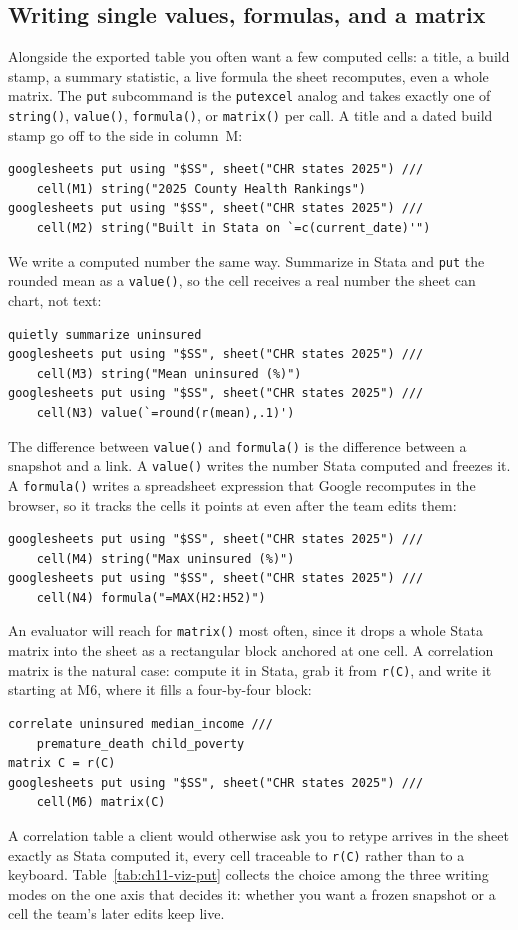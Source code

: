 \subsection{Writing single values, formulas, and a matrix}
Alongside the exported table you often want a few computed cells: a title, a build stamp, a summary statistic, a live formula the sheet recomputes, even a whole matrix. The \texttt{put} subcommand is the \texttt{putexcel} analog and takes exactly one of \texttt{string()}, \texttt{value()}, \texttt{formula()}, or \texttt{matrix()} per call. A title and a dated build stamp go off to the side in column~M:
\par
{\footnotesize
\begin{verbatim}
googlesheets put using "$SS", sheet("CHR states 2025") ///
    cell(M1) string("2025 County Health Rankings")
googlesheets put using "$SS", sheet("CHR states 2025") ///
    cell(M2) string("Built in Stata on `=c(current_date)'")
\end{verbatim}
}
We write a computed number the same way. Summarize in Stata and \texttt{put} the rounded mean as a \texttt{value()}, so the cell receives a real number the sheet can chart, not text:
\par
{\footnotesize
\begin{verbatim}
quietly summarize uninsured
googlesheets put using "$SS", sheet("CHR states 2025") ///
    cell(M3) string("Mean uninsured (%)")
googlesheets put using "$SS", sheet("CHR states 2025") ///
    cell(N3) value(`=round(r(mean),.1)')
\end{verbatim}
}
The difference between \texttt{value()} and \texttt{formula()} is the difference between a snapshot and a link. A \texttt{value()} writes the number Stata computed and freezes it. A \texttt{formula()} writes a spreadsheet expression that Google recomputes in the browser, so it tracks the cells it points at even after the team edits them:
\par
{\footnotesize
\begin{verbatim}
googlesheets put using "$SS", sheet("CHR states 2025") ///
    cell(M4) string("Max uninsured (%)")
googlesheets put using "$SS", sheet("CHR states 2025") ///
    cell(N4) formula("=MAX(H2:H52)")
\end{verbatim}
}
An evaluator will reach for \texttt{matrix()} most often, since it drops a whole Stata matrix into the sheet as a rectangular block anchored at one cell. A correlation matrix is the natural case: compute it in Stata, grab it from \texttt{r(C)}, and write it starting at M6, where it fills a four-by-four block:
\par
{\footnotesize
\begin{verbatim}
correlate uninsured median_income ///
    premature_death child_poverty
matrix C = r(C)
googlesheets put using "$SS", sheet("CHR states 2025") ///
    cell(M6) matrix(C)
\end{verbatim}
}
A correlation table a client would otherwise ask you to retype arrives in the sheet exactly as Stata computed it, every cell traceable to \texttt{r(C)} rather than to a keyboard. Table~\ref{tab:ch11-viz-put} collects the choice among the three writing modes on the one axis that decides it: whether you want a frozen snapshot or a cell the team's later edits keep live.

